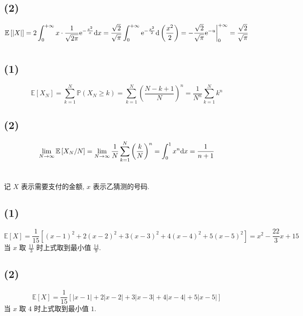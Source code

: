 \documentclass[8pt]{article}
\theoremstyle{compact}
\def\ge{\geqslant}
\def\P#1{\mathbb{P}\left({#1}\right)}
\def\e{\mathrm{e}}
\def\E#1{\mathbb{E}\left[{#1}\right]}
\begin{document}
\subsection*{(2)}
\begin{equation*}
	\E{|X|} = 2\int_{0}^{+\infty}x\cdot\frac{1}{\sqrt{2\pi}}\e^{-\frac{x^2}{x}}\text dx = \frac{\sqrt2}{\sqrt{\pi}}\int_{0}^{+\infty}\e^{-\frac{x^2}{2}}\text d\left(\frac{x^2}2\right) = -\frac{\sqrt2}{\sqrt{\pi}}\e^{-u}\bigg|_0^{+\infty} = \frac{\sqrt2}{\sqrt{\pi}}
\end{equation*}
\section{}
\subsection*{(1)}
\begin{equation*}
	\E{X_N} = \sum_{k=1}^{N}\P{X_N \ge k} = \sum_{k=1}^{N}\left(\frac {N-k+1}N\right)^n = \frac{1}{N^n}\sum_{k=1}^{N}k^n
\end{equation*}
\subsection*{(2)}
\begin{equation*}
	\lim_{N \to \infty}\E{X_N / N} = \lim_{N \to \infty}\frac1N\sum_{k=1}^{N}\left(\frac kN\right)^n = \int_{0}^{1}x^n\text dx = \frac{1}{n+1}
\end{equation*}
\section{}
记 $X$ 表示需要支付的金额, $x$ 表示乙猜测的号码.
\subsection*{(1)}
\begin{equation*}
	\E{X} = \frac{1}{15}\left[(x - 1)^2 + 2(x - 2)^2 + 3(x-3)^2 + 4(x - 4)^2 + 5(x - 5)^2\right] = x^2 - \frac{22}{3}x + 15
\end{equation*}
当 $x$ 取 $\frac{11}{3}$ 时上式取到最小值 $\frac{14}{9}$.
\subsection*{(2)}
\begin{equation*}
	\E{X} = \frac{1}{15}\left[|x - 1| + 2|x-2| + 3|x-3| + 4|x-4| + 5|x-5|\right]
\end{equation*}
当 $x$ 取 $4$ 时上式取到最小值 $1$.
\end{document}

